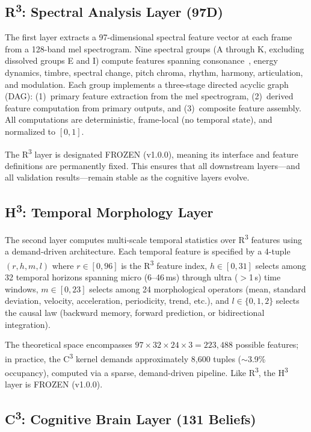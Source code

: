 \documentclass[twocolumn,10pt]{article}
\newcommand{\rthree}{R\textsuperscript{3}}
\newcommand{\hthree}{H\textsuperscript{3}}
\newcommand{\cthree}{C\textsuperscript{3}}
\begin{document}
\subsection{\rthree{}: Spectral Analysis Layer (97D)}

The first layer extracts a 97-dimensional spectral feature vector at each frame from a 128-band mel spectrogram. Nine spectral groups (A through K, excluding dissolved groups E and I) compute features spanning consonance~\citep{sethares1993, plomp1965}, energy dynamics, timbre, spectral change, pitch chroma, rhythm, harmony, articulation, and modulation. Each group implements a three-stage directed acyclic graph (DAG): (1)~primary feature extraction from the mel spectrogram, (2)~derived feature computation from primary outputs, and (3)~composite feature assembly. All computations are deterministic, frame-local (no temporal state), and normalized to $[0, 1]$.

The \rthree{} layer is designated FROZEN (v1.0.0), meaning its interface and feature definitions are permanently fixed. This ensures that all downstream layers---and all validation results---remain stable as the cognitive layers evolve.

\subsection{\hthree{}: Temporal Morphology Layer}

The second layer computes multi-scale temporal statistics over \rthree{} features using a demand-driven architecture. Each temporal feature is specified by a 4-tuple $(r, h, m, l)$ where $r \in [0, 96]$ is the \rthree{} feature index, $h \in [0, 31]$ selects among 32 temporal horizons spanning micro (6--46\,ms) through ultra ($>$1\,s) time windows, $m \in [0, 23]$ selects among 24 morphological operators (mean, standard deviation, velocity, acceleration, periodicity, trend, etc.), and $l \in \{0, 1, 2\}$ selects the causal law (backward memory, forward prediction, or bidirectional integration).

The theoretical space encompasses $97 \times 32 \times 24 \times 3 = 223{,}488$ possible features; in practice, the \cthree{} kernel demands approximately 8,600 tuples ($\sim$3.9\% occupancy), computed via a sparse, demand-driven pipeline. Like \rthree{}, the \hthree{} layer is FROZEN (v1.0.0).

\subsection{\cthree{}: Cognitive Brain Layer (131 Beliefs)}
\end{document}
